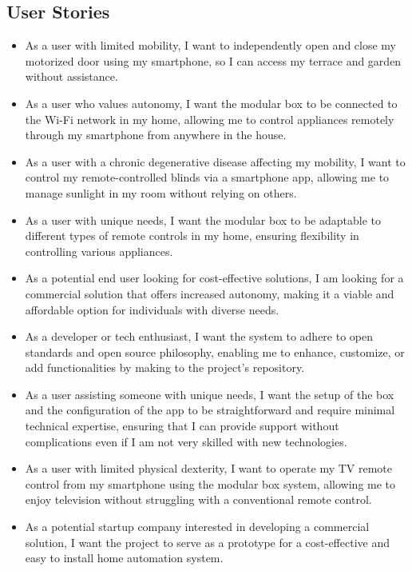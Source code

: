 \subsection{User Stories}

\begin{itemize}
    \item As a user with limited mobility, I want to independently open and close my motorized door using my smartphone, so I can access my terrace and garden without assistance.
    \item As a user who values autonomy, I want the modular box to be connected to the Wi-Fi network in my home, allowing me to control appliances remotely through my smartphone from anywhere in the house.
    \item As a user with a chronic degenerative disease affecting my mobility, I want to control my remote-controlled blinds via a smartphone app, allowing me to manage sunlight in my room without relying on others.
    \item As a user with unique needs, I want the modular box to be adaptable to different types of remote controls in my home, ensuring flexibility in controlling various appliances.
    \item As a potential end user looking for cost-effective solutions, I am looking for a commercial solution that offers increased autonomy, making it a viable and affordable option for individuals with diverse needs.
    \item As a developer or tech enthusiast, I want the system to adhere to open standards and open source philosophy, enabling me to enhance, customize, or add functionalities by making  to the project's repository.
    \item As a user assisting someone with unique needs, I want the setup of the box and the configuration of the app to be straightforward and require minimal technical expertise, ensuring that I can provide support without complications even if I am not very skilled with new technologies.
    \item As a user with limited physical dexterity, I want to operate my TV remote control from my smartphone using the modular box system, allowing me to enjoy television without struggling with a conventional remote control.
    \item As a potential startup company interested in developing a commercial solution, I want the project to serve as a prototype for a cost-effective and easy to install home automation system.
\end{itemize}

